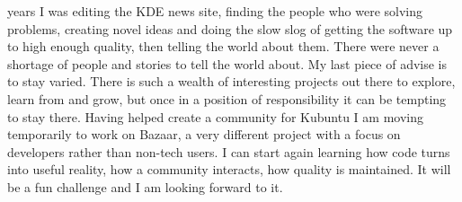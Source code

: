 years I was editing the KDE news site, finding the people who were solving
problems, creating novel ideas and doing the slow slog of getting the software
up to high enough quality, then telling the world about them. There were never a
shortage of people and stories to tell the world about. 
My last piece of advise is to stay varied. There is such a wealth of interesting
projects out there to explore, learn from and grow, but once in a position of
responsibility it can be tempting to stay there. Having helped create a
community for Kubuntu I am moving temporarily to work on Bazaar, a very
different project with a focus on developers rather than non-tech users. I can
start again learning how code turns into useful reality, how a community
interacts, how quality is maintained. It will be a fun challenge and I am
looking forward to it.
